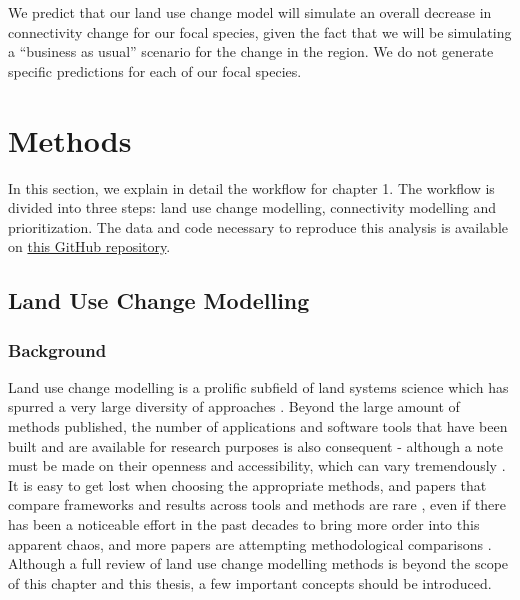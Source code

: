 We predict that our land use change model will simulate an overall decrease in connectivity change for our focal species, given the fact that we will be simulating a “business as usual” scenario for the change in the region. We do not generate specific predictions for each of our focal species.\\

\section{Methods}
In this section, we explain in detail the workflow for chapter 1. The workflow is divided into three steps: land use change modelling, connectivity modelling and prioritization. The data and code necessary to reproduce this analysis is available on \href{https://github.com/VLucet/landchange-connectivity-monteregie}{this GitHub repository}.\\

\subsection{Land Use Change Modelling}

\subsubsection{Background}
Land use change modelling is a prolific subfield of land systems science which has spurred a very large diversity of approaches \citep{dang_review_2016, noszczyk_review_2018}. Beyond the large amount of methods published, the number of applications and software tools that have been built and are available for research purposes is also consequent - although a note must be made on their openness and accessibility, which can vary tremendously \citep{moulds_open_2015}. It is easy to get lost when choosing the appropriate methods, and papers that compare frameworks and results across tools and methods are rare \citep{pontius_comparing_2008,pontius_comparison_2005}, even if there has been a noticeable effort in the past decades to bring more order into this apparent chaos, and  more papers are attempting methodological comparisons \citep{sun_comparison_2018}. Although a full review of land use change modelling methods is beyond the scope of this chapter and this thesis, a few important concepts should be introduced.


